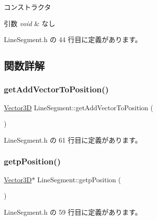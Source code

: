 コンストラクタ 


\begin{DoxyParams}{引数}
{\em void} & なし \\
\hline
\end{DoxyParams}


 Line\+Segment.\+h の 44 行目に定義があります。



\subsection{関数詳解}
\mbox{\label{class_line_segment_af4c9249a6a1c6c75b12962ef29e6dd30}} 
\subsubsection{\texorpdfstring{get\+Add\+Vector\+To\+Position()}{getAddVectorToPosition()}}
{\footnotesize\ttfamily \mbox{\hyperlink{class_vector3_d}{Vector3D}} Line\+Segment\+::get\+Add\+Vector\+To\+Position (\begin{DoxyParamCaption}{ }\end{DoxyParamCaption})\hspace{0.3cm}{\ttfamily [inline]}}



 Line\+Segment.\+h の 61 行目に定義があります。

\mbox{\label{class_line_segment_a13877c27e539e948fe8db0f34853e3da}} 
\subsubsection{\texorpdfstring{getp\+Position()}{getpPosition()}}
{\footnotesize\ttfamily \mbox{\hyperlink{class_vector3_d}{Vector3D}}$\ast$ Line\+Segment\+::getp\+Position (\begin{DoxyParamCaption}{ }\end{DoxyParamCaption})\hspace{0.3cm}{\ttfamily [inline]}}



 Line\+Segment.\+h の 59 行目に定義があります。

